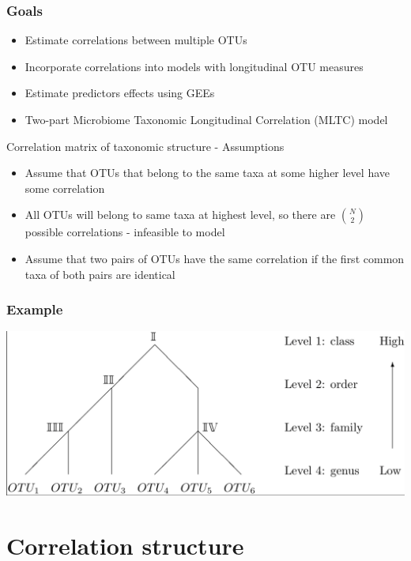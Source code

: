 \documentclass{beamer}
\begin{document}
\begin{frame}
\frametitle{Goals}
\begin{itemize}
  \item Estimate correlations between multiple OTUs
  \item Incorporate correlations into models with longitudinal OTU measures
  \item Estimate predictors effects using GEEs
  \item Two-part Microbiome Taxonomic Longitudinal Correlation (MLTC) model
\end{itemize}
\end{frame}



\begin{frame}[t]{Correlation matrix of taxonomic structure - Assumptions}
  \begin{itemize}
    \item Assume that OTUs that belong to the same taxa at some higher level have some correlation
    \item All OTUs will belong to same taxa at highest level, so there are $\binom{N}{2}$ possible correlations - infeasible to model
    \item Assume that two pairs of OTUs have the same correlation if the first common taxa of both pairs are identical


  \end{itemize} 
\end{frame}


\begin{frame}
\frametitle{Example}

\includegraphics[width = \textwidth]{otu_tree.png}

\end{frame}

\section{Correlation structure}
\end{document}

